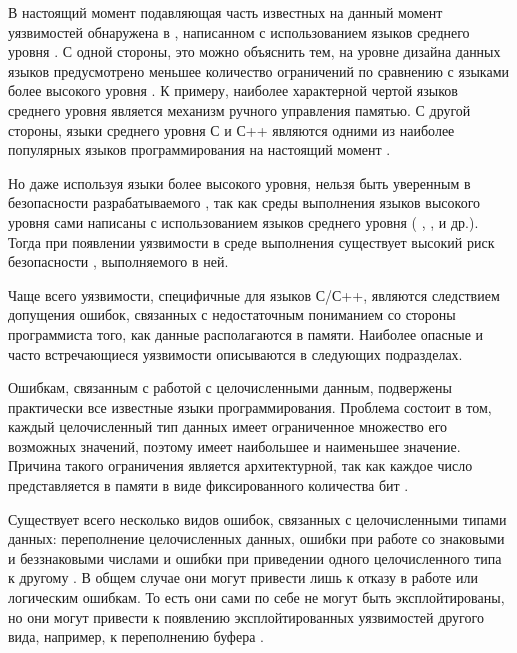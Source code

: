 %
В настоящий момент подавляющая часть известных на данный момент уязвимостей обнаружена в 
, написанном с использованием языков среднего уровня  
 . 
%
С одной стороны, это можно объяснить тем, на уровне дизайна данных языков предусмотрено меньшее 
количество ограничений по сравнению с языками более высокого уровня . 
%
К примеру, наиболее характерной чертой языков среднего уровня является механизм ручного управления 
памятью. 
%
С другой стороны, языки среднего уровня С  и С++ 
 являются одними из наиболее популярных языков программирования 
на настоящий момент .

%
Но даже используя языки более высокого уровня, нельзя быть уверенным в безопасности 
разрабатываемого , так как среды выполнения языков высокого уровня сами 
написаны с использованием 
языков среднего уровня ( ,  , 
  и др.). 
%
Тогда при появлении уязвимости в среде выполнения существует высокий риск безопасности 
, выполняемого в ней.

%
Чаще всего уязвимости, специфичные для языков С/С++, являются следствием допущения ошибок, 
связанных с недостаточным пониманием со стороны программиста того, как данные располагаются 
в памяти.
%
Наиболее опасные и часто встречающиеся  уязвимости описываются 
в следующих подразделах. 



%
Ошибкам, связанным с работой с целочисленными данным, подвержены практически все известные языки 
программирования. 
%
Проблема состоит в том, каждый целочисленный тип данных имеет ограниченное множество его возможных 
значений, поэтому имеет наибольшее и наименьшее значение. 
%
Причина такого ограничения является архитектурной, так как каждое число представляется в памяти 
в виде фиксированного количества бит .

%
Существует всего несколько видов ошибок, связанных с целочисленными типами данных: переполнение 
целочисленных данных, ошибки при работе со знаковыми и беззнаковыми числами и ошибки при приведении 
одного целочисленного типа к другому   
 . 
%
В общем случае они могут привести лишь к отказу в работе или логическим ошибкам. 
%
То есть они сами по себе не могут быть эксплойтированы, но они могут привести к появлению 
эксплойтированных уязвимостей другого вида, например, к переполнению буфера . 

